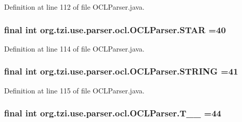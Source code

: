 Definition at line 112 of file O\-C\-L\-Parser.\-java.

\hypertarget{classorg_1_1tzi_1_1use_1_1parser_1_1ocl_1_1_o_c_l_parser_a20893d135861bf6dc6adb155658143d1}{
\subsubsection[{S\-T\-A\-R}]{\setlength{\rightskip}{0pt plus 5cm}final int org.\-tzi.\-use.\-parser.\-ocl.\-O\-C\-L\-Parser.\-S\-T\-A\-R =40\hspace{0.3cm}{\ttfamily [static]}}}\label{classorg_1_1tzi_1_1use_1_1parser_1_1ocl_1_1_o_c_l_parser_a20893d135861bf6dc6adb155658143d1}


Definition at line 114 of file O\-C\-L\-Parser.\-java.

\hypertarget{classorg_1_1tzi_1_1use_1_1parser_1_1ocl_1_1_o_c_l_parser_a759266d152d2d7e5490b6c2fe0821774}{
\subsubsection[{S\-T\-R\-I\-N\-G}]{\setlength{\rightskip}{0pt plus 5cm}final int org.\-tzi.\-use.\-parser.\-ocl.\-O\-C\-L\-Parser.\-S\-T\-R\-I\-N\-G =41\hspace{0.3cm}{\ttfamily [static]}}}\label{classorg_1_1tzi_1_1use_1_1parser_1_1ocl_1_1_o_c_l_parser_a759266d152d2d7e5490b6c2fe0821774}


Definition at line 115 of file O\-C\-L\-Parser.\-java.

\hypertarget{classorg_1_1tzi_1_1use_1_1parser_1_1ocl_1_1_o_c_l_parser_a83f8d27f53584486e9194e692ea37567}{
\subsubsection[{T\-\_\-\-\_\-44}]{\setlength{\rightskip}{0pt plus 5cm}final int org.\-tzi.\-use.\-parser.\-ocl.\-O\-C\-L\-Parser.\-T\-\_\-\-\_ =44\hspace{0.3cm}{\ttfamily [static]}}}\label{classorg_1_1tzi_1_1use_1_1parser_1_1ocl_1_1_o_c_l_parser_a83f8d27f53584486e9194e692ea37567}


